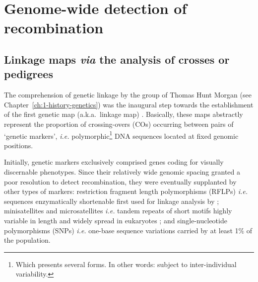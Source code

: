 




\section{Genome-wide detection of recombination}

\subsection{Linkage maps \textit{via} the analysis of crosses or pedigrees}
\label{chap3:linkage-maps}

The comprehension of genetic linkage by the group of Thomas Hunt Morgan (see Chapter~\ref{ch:1-history-genetics}) was the inaugural step towards the establishment of the first genetic map (a.k.a.\ linkage map) \citep{sturtevant1913linear}.
Basically, these maps abstractly represent the proportion of crossing-overs (COs) occurring between pairs of ‘genetic markers’, \textit{i.e.} polymorphic\footnote{Which presents several forms. In other words: subject to inter-individual variability.} DNA sequences located at fixed genomic positions.

Initially, genetic markers exclusively comprised genes coding for visually discernable phenotypes.
Since their relatively wide genomic spacing granted a poor resolution to detect recombination, they were eventually supplanted by other types of markers: restriction fragment length polymorphisms (RFLPs) \textit{i.e.} sequences enzymatically shortenable first used for linkage analysis by \citet{botstein1980construction}; minisatellites and microsatellites \citep{hamada1982potential} \textit{i.e.} tandem repeats of short motifs highly variable in length \citep{ellegren2004microsatellites} and widely spread in eukaryotes \citep{hamada1982novel}; and single-nucleotide polymorphisms (SNPs) \textit{i.e.} one-base sequence variations carried by at least 1\% of the population.\\

